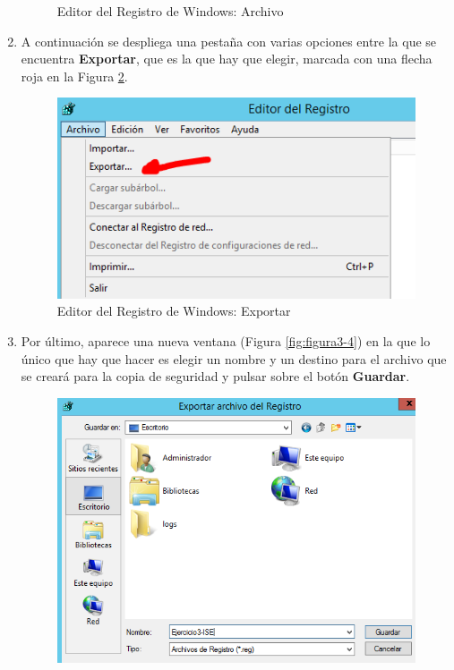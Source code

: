 \begin{enumerate}
\begin{figure}[H]
				\caption{Editor del Registro de Windows: Archivo} 
				\label{fig:figura3-2}
			\end{figure}
		\item A continuación se despliega una pestaña con varias opciones entre la que se encuentra \textbf{Exportar}, que es la que hay que elegir, marcada con una flecha roja en la Figura \ref{fig:figura3-3}.
			\begin{figure}[H] %
				\centering
				\includegraphics[scale=0.9]{figuras/ejercicio3/figura3-3.png} 
				\caption{Editor del Registro de Windows: Exportar} 
				\label{fig:figura3-3}
			\end{figure}
		\item Por último, aparece una nueva ventana (Figura \ref{fig:figura3-4}) en la que lo único que hay que hacer es elegir un nombre y un destino para el archivo que se creará para la copia de seguridad y pulsar sobre el botón \textbf{Guardar}.
			\begin{figure}[H] %
				\centering
				\includegraphics[scale=0.8]{figuras/ejercicio3/figura3-4.png} 

\end{figure}
\end{enumerate}
